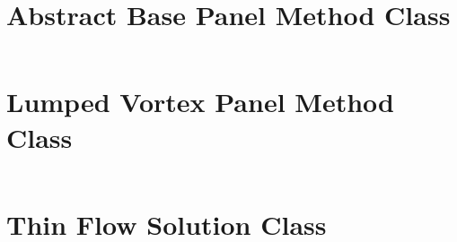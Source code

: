 \section{Abstract Base Panel Method Class}
\inputminted[firstline=321,lastline=512]{python}{../src/numfoil/solver/base.py}

\section{Lumped Vortex Panel Method Class}
\inputminted{python}{../src/numfoil/solver/m_lumped_vortex.py}

\section{Thin Flow Solution Class}
\inputminted[firstline=220,lastline=241]{python}{../src/numfoil/solver/base.py}
